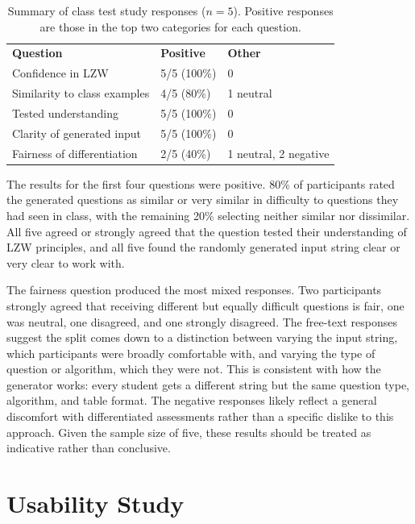 \documentclass{l4proj}
\begin{document}
\begin{table}[htb]
\label{tab:class_test_summary}
\begin{tabular}{@{}lll@{}}
\textbf{Question} & \textbf{Positive} & \textbf{Other} \\
Confidence in LZW              & 5/5 (100\%) & 0 \\
Similarity to class examples   & 4/5 (80\%)  & 1 neutral \\
Tested understanding           & 5/5 (100\%) & 0 \\
Clarity of generated input     & 5/5 (100\%) & 0 \\
Fairness of differentiation    & 2/5 (40\%)  & 1 neutral, 2 negative \\
\end{tabular}
\caption{Summary of class test study responses ($n = 5$). Positive responses
are those in the top two categories for each question.}
\end{table}

The results for the first four questions were positive. 80\% of participants rated the generated questions as similar or very similar in difficulty to questions they had seen in class, with the remaining 20\% selecting neither similar nor dissimilar. All five agreed or strongly agreed that the question tested their understanding of LZW principles, and all five found the randomly generated input string clear or very clear to work with.

The fairness question produced the most mixed responses. Two participants strongly agreed that receiving different but equally difficult questions is fair, one was neutral, one disagreed, and one strongly disagreed. The free-text responses suggest the split comes down to a distinction between varying the input string, which participants were broadly comfortable with, and varying the type of question or algorithm, which they were not. This is consistent with how the generator works: every student gets a different string but the same question type, algorithm, and table format. The negative responses likely reflect a general discomfort with differentiated assessments rather than a specific dislike to this approach. Given the sample size of five, these results should be treated as indicative rather than conclusive.

\section{Usability Study}
\end{document}
